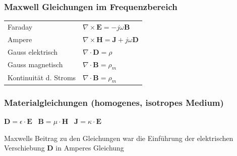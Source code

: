 \documentclass[english]{latex4ei/latex4ei_sheet}
\begin{document}
\begin{sectionbox}


    \subsubsection{Maxwell Gleichungen im Frequenzbereich}
    \begin{tabular*}{\columnwidth}{ll}
        Faraday &$\nabla \times \mathbf{E} = -j\omega \mathbf{B}$ \\
        Ampere &$\nabla \times \mathbf{H} = \mathbf{J} + j\omega\mathbf{D}$\\
        Gauss elektrisch &$\nabla \cdot \mathbf{D} = \rho$ \\
        Gauss magnetisch &$\nabla \cdot \mathbf{B} = \rho_m$ \\
        Kontinuität d. Stroms &$\nabla \cdot \mathbf{B} = \rho_m$
    \end{tabular*}

    \subsubsection{Materialgleichungen (homogenes, isotropes Medium)}
    \begin{emphbox}
        \large $\mathbf{D} = \epsilon \cdot \mathbf{E}$ \quad\ $\mathbf{B} = \mu \cdot \mathbf{H}$ \quad\ $\mathbf{J} = \kappa \cdot \mathbf{E}$
    \end{emphbox}

    Maxwells Beitrag zu den Gleichungen war die Einführung der elektrischen Verschiebung $\mathbf{D}$ in Amperes Gleichung
\end{sectionbox}
\end{document}
